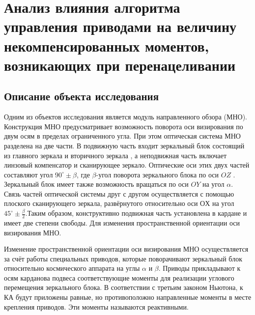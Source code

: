 \chapter{Анализ влияния алгоритма управления приводами на величину некомпенсированных моментов, возникающих при перенацеливании}\label{ch:ch2}
\section{Описание объекта исследования}\label{sec:ch2/sec1}

Одним из объектов исследования является модуль направленного обзора (МНО). Конструкция МНО предусматривает возможность поворота оси 
визирования по двум осям в пределах ограниченного угла. При этом оптическая 
система МНО разделена на две части. В подвижную часть входит зеркальный блок состоящий из главного зеркала  и вторичного зеркала , а неподвижная часть включает линзовый компенсатор и сканирующее зеркало. Оптические оси этих двух частей составляют угол $90^\circ \pm \beta$, где $\beta$-угол поворота зеркального блока по оси $OZ$ . Зеркальный блок имеет также возможность вращаться по оси $OY$ на угол $\alpha$. Связь частей оптической системы друг с другом осуществляется с помощью плоского сканирующего зеркала, развёрнутого относительно оси $ОХ$ на угол $45^\circ \pm \frac{\beta}{2}$.Таким образом, конструктивно подвижная часть установлена в кардане и имеет две степени свободы. Для изменения пространственной ориентации оси визирования МНО.


Изменение пространственной ориентации оси визирования МНО осуществляется за счёт работы специальных приводов, которые поворачивают зеркальный блок относительно космического аппарата на углы $\alpha$ и $\beta$.
Приводы прикладывают к осям карданова подвеса соответствующие моменты для реализации углового перемещения зеркального блока. В соответствии с третьим законом Ньютона, к КА будут приложены равные, но противоположно направленные моменты в месте крепления приводов. Эти моменты называются реактивными.

